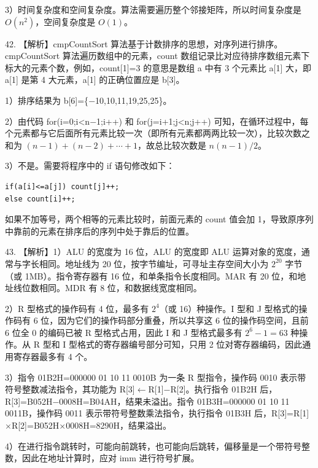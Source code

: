 \documentclass[UTF8,11pt]{ctexart}
\begin{document}
3）时间复杂度和空间复杂度。算法需要遍历整个邻接矩阵，所以时间复杂度是 \(\displaystyle O(n^2)\)，空间复杂度是 \(\displaystyle O(1)\)。


42. 【解析】cmpCountSort 算法基于计数排序的思想，对序列进行排序。cmpCountSort 算法遍历数组中的元素，count 数组记录比对应待排序数组元素下标大的元素个数，例如，count[1]=3 的意思是数组 a 中有 3 个元素比 a[1] 大，即 a[1] 是第 4 大元素，a[1] 的正确位置应是 b[3]。


1）排序结果为 b[6]=\{\(\displaystyle -\)10,10,11,19,25,25\}。


2）由代码 for(i=0;i<n\(\displaystyle -\)1;i++) 和 for(j=i+1;j<n;j++) 可知，在循环过程中，每个元素都与它后面所有元素比较一次（即所有元素都两两比较一次），比较次数之和为 \(\displaystyle (n−1)+(n−2)+\cdots+1\)，故总比较次数是 \(\displaystyle n(n−1)/2\)。


3）不是。需要将程序中的 if 语句修改如下：


\begin{Verbatim}[breaklines,breakanywhere,fontsize=\small]
if(a[i]<=a[j]) count[j]++;
else count[i]++;
\end{Verbatim}

如果不加等号，两个相等的元素比较时，前面元素的 count 值会加 1，导致原序列中靠前的元素在排序后的序列中处于靠后的位置。


43. 【解析】1）ALU 的宽度为 16 位，ALU 的宽度即 ALU 运算对象的宽度，通常与字长相同。地址线为 20 位，按字节编址，可寻址主存空间大小为 \(\displaystyle 2^{20}\) 字节（或 1MB）。指令寄存器有 16 位，和单条指令长度相同。MAR 有 20 位，和地址线位数相同。MDR 有 8 位，和数据线宽度相同。


2）R 型格式的操作码有 4 位，最多有 \(\displaystyle 2^4\)（或 16）种操作。I 型和 J 型格式的操作码有 6 位，因为它们的操作码部分重叠，所以共享这 6 位的操作码空间，且前 6 位全 0 的编码已被 R 型格式占用，因此 I 和 J 型格式最多有 \(\displaystyle 2^6−1=63\) 种操作。从 R 型和 I 型格式的寄存器编号部分可知，只用 2 位对寄存器编码，因此通用寄存器最多有 4 个。


3）指令 01B2H=000000 01 10 11 0010B 为一条 R 型指令，操作码 0010 表示带符号整数减法指令，其功能为 R[3]\(\displaystyle \leftarrow\)R[1]\(\displaystyle -\)R[2]。执行指令 01B2H 后，R[3]=B052H\(\displaystyle -\)0008H=B04AH，结果未溢出。指令 01B3H=000000 01 10 11 0011B，操作码 0011 表示带符号整数乘法指令，执行指令 01B3H 后，R[3]=R[1]\(\displaystyle \times\)R[2]=B052H\(\displaystyle \times\)0008H=8290H，结果溢出。


4）在进行指令跳转时，可能向前跳转，也可能向后跳转，偏移量是一个带符号整数，因此在地址计算时，应对 imm 进行符号扩展。
\end{document}

